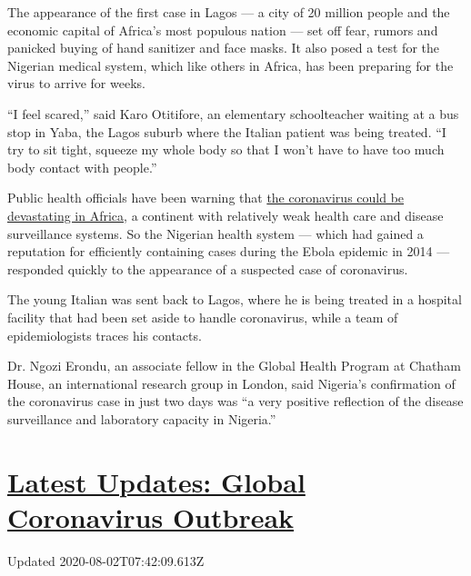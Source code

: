 The appearance of the first case in Lagos --- a city of 20 million
people and the economic capital of Africa's most populous nation --- set
off fear, rumors and panicked buying of hand sanitizer and face masks.
It also posed a test for the Nigerian medical system, which like others
in Africa, has been preparing for the virus to arrive for weeks.

``I feel scared,'' said Karo Otitifore, an elementary schoolteacher
waiting at a bus stop in Yaba, the Lagos suburb where the Italian
patient was being treated. ``I try to sit tight, squeeze my whole body
so that I won't have to have too much body contact with people.''

Public health officials have been warning that
\href{https://www.nytimes.com/2020/02/06/world/africa/africa-coronavirus-china.html}{the
coronavirus could be devastating in Africa}, a continent with relatively
weak health care and disease surveillance systems. So the Nigerian
health system --- which had gained a reputation for efficiently
containing cases during the Ebola epidemic in 2014 --- responded quickly
to the appearance of a suspected case of coronavirus.

The young Italian was sent back to Lagos, where he is being treated in a
hospital facility that had been set aside to handle coronavirus, while a
team of epidemiologists traces his contacts.

Dr. Ngozi Erondu, an associate fellow in the Global Health Program at
Chatham House, an international research group in London, said Nigeria's
confirmation of the coronavirus case in just two days was ``a very
positive reflection of the disease surveillance and laboratory capacity
in Nigeria.''

\hypertarget{latest-updates-global-coronavirus-outbreak}{%
\section{\texorpdfstring{\href{https://www.nytimes.com/2020/08/01/world/coronavirus-covid-19.html?action=click\&pgtype=Article\&state=default\&region=MAIN_CONTENT_1\&context=storylines_live_updates}{Latest
Updates: Global Coronavirus
Outbreak}}{Latest Updates: Global Coronavirus Outbreak}}\label{latest-updates-global-coronavirus-outbreak}}

Updated 2020-08-02T07:42:09.613Z

